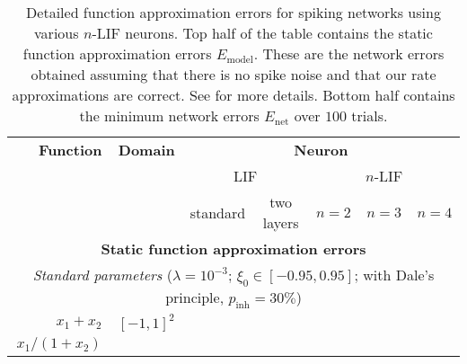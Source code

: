 \begin{table}
\centering\vspace{0.5cm}
\caption[Detailed function approximation errors for spiking networks using various $n$-LIF neurons]{Detailed function approximation errors for spiking networks using various $n$-LIF neurons.
Top half of the table contains the static function approximation errors $E_\mathrm{model}$.
These are the network errors obtained assuming that there is no spike noise and that our rate approximations are correct.
See  for more details.
Bottom half contains the minimum network errors $E_\mathrm{net}$ over $100$ trials.
}
\label{tbl:function_approximations_nlif_model}
\fontsize{10pt}{12pt}\selectfont
\setlength{\tabcolsep}{10pt}
\renewcommand\arraystretch{1.12}
\sffamily
\begin{tabular}{r r r r r r r }
\toprule
\textbf{Function} & \textbf{Domain} & \multicolumn{5}{c}{\textbf{Neuron}} \\
\cmidrule(r){1-1}\cmidrule(r){2-2}\cmidrule{3-7}
&
&	 \multicolumn{2}{c}{LIF}
&	 \multicolumn{3}{c}{$n$-LIF}
\\
\cmidrule(r){3-4}\cmidrule{5-7}
&
&	 \multicolumn{1}{c}{standard}
&	 \multicolumn{1}{c}{two layers}
&	 \multicolumn{1}{c}{$n = 2$}
&	 \multicolumn{1}{c}{$n = 3$}
&	 \multicolumn{1}{c}{$n = 4$}
\\

\midrule
\multicolumn{7}{c}{\textbf{Static function approximation errors}}\\
\multicolumn{7}{c}{\textit{Standard parameters} ($\lambda = 10^{-3}$; $\xi_0 \in [-0.95, 0.95]$; with Dale's principle, $p_\mathrm{inh} = 30\%$)} \\

\midrule

$x_1 + x_2$

& $[-1, 1]^2$

& \cellcolor{White!100!SteelBlue}{$\mathbf{2.1 \pm 0.6 \%}$}

& \cellcolor{White!80!SteelBlue}{$2.2 \pm 0.4 \%$}

& \cellcolor{White!20!SteelBlue}{$2.7 \pm 0.6 \%$}

& \cellcolor{White!80!SteelBlue}{$2.2 \pm 0.6 \%$}

& \cellcolor{White!80!SteelBlue}{$2.2 \pm 0.6 \%$}

\\

$x_1 / (1 + x_2)$


\end{tabular}
\end{table}
